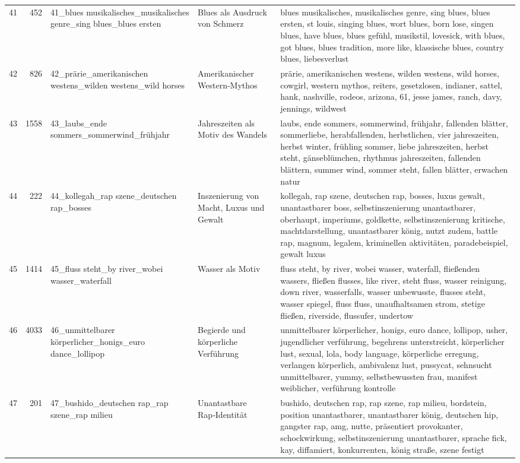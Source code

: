 \begin{longtable}{rrlll}
41 & 452 & 41\_blues musikalisches\_musikalisches genre\_sing blues\_blues ersten & Blues als Ausdruck von Schmerz & blues musikalisches, musikalisches genre, sing blues, blues ersten, st louis, singing blues, wort blues, born lose, singen blues, have blues, blues gefühl, musikstil, lovesick, with blues, got blues, blues tradition, more like, klassische blues, country blues, liebesverlust \\
42 & 826 & 42\_prärie\_amerikanischen westens\_wilden westens\_wild horses & Amerikanischer Western‑Mythos & prärie, amerikanischen westens, wilden westens, wild horses, cowgirl, western mythos, reiters, gesetzlosen, indianer, sattel, hank, nashville, rodeos, arizona, 61, jesse james, ranch, davy, jennings, wildwest \\
43 & 1558 & 43\_laubs\_ende sommers\_sommerwind\_frühjahr & Jahreszeiten als Motiv des Wandels & laubs, ende sommers, sommerwind, frühjahr, fallenden blätter, sommerliebe, herabfallenden, herbstlichen, vier jahreszeiten, herbst winter, frühling sommer, liebe jahreszeiten, herbst steht, gänseblümchen, rhythmus jahreszeiten, fallenden blättern, summer wind, sommer steht, fallen blätter, erwachen natur \\
44 & 222 & 44\_kollegah\_rap szene\_deutschen rap\_bosses & Inszenierung von Macht, Luxus und Gewalt & kollegah, rap szene, deutschen rap, bosses, luxus gewalt, unantastbarer boss, selbstinszenierung unantastbarer, oberhaupt, imperiums, goldkette, selbstinszenierung kritische, machtdarstellung, unantastbarer könig, nutzt zudem, battle rap, magnum, legalem, kriminellen aktivitäten, paradebeispiel, gewalt luxus \\
45 & 1414 & 45\_fluss steht\_by river\_wobei wasser\_waterfall & Wasser als Motiv & fluss steht, by river, wobei wasser, waterfall, fließenden wassers, fließen flusses, like river, steht fluss, wasser reinigung, down river, wasserfalls, wasser unbewusste, flusses steht, wasser spiegel, fluss fluss, unaufhaltsamen strom, stetige fließen, riverside, flussufer, undertow \\
46 & 4033 & 46\_unmittelbarer körperlicher\_honigs\_euro dance\_lollipop & Begierde und körperliche Verführung & unmittelbarer körperlicher, honigs, euro dance, lollipop, usher, jugendlicher verführung, begehrens unterstreicht, körperlicher lust, sexual, lola, body language, körperliche erregung, verlangen körperlich, ambivalenz lust, pussycat, sehnsucht unmittelbarer, yummy, selbstbewussten frau, manifest weiblicher, verführung kontrolle \\
47 & 201 & 47\_bushido\_deutschen rap\_rap szene\_rap milieu & Unantastbare Rap‑Identität & bushido, deutschen rap, rap szene, rap milieu, bordstein, position unantastbarer, unantastbarer könig, deutschen hip, gangster rap, amg, nutte, präsentiert provokanter, schockwirkung, selbstinszenierung unantastbarer, sprache fick, kay, diffamiert, konkurrenten, könig straße, szene festigt \\

\end{longtable}
